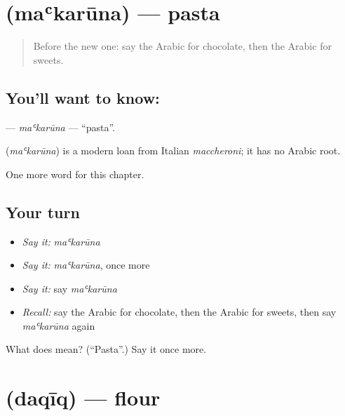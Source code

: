 \section[\texorpdfstring{\ar{معكرونة} (maʿkarūna)}{معكرونة (maʿkarūna)}]{ (maʿkarūna) — pasta}

\label{lesson:AR-C273-makaruna}



\begin{quote}
Before the new one: say the Arabic for chocolate, then the Arabic for sweets.
\end{quote}

\subsection*{You'll want to know: }
\textbf{} — \emph{maʿkarūna} — \textquotedblleft{}pasta\textquotedblright{}.

\begin{cousinweb}
\textbf{} (\emph{maʿkarūna}) is a modern loan from Italian \emph{maccheroni}; it has no Arabic root.
\end{cousinweb}

\begin{grammarlens}[title={What you've built}]
One more word for this chapter.
\end{grammarlens}

\subsection*{Your turn}
\begin{itemize}
\raggedright
  \item \emph{Say it:} \emph{maʿkarūna}
  \item \emph{Say it:} \emph{maʿkarūna}, once more
  \item \emph{Say it:} say \emph{maʿkarūna}
  \item \emph{Recall:} say the Arabic for chocolate, then the Arabic for sweets, then say \emph{maʿkarūna} again
\end{itemize}

\begin{tcolorbox}[breakable,colback=teal!4,colframe=teal!35!black,title={Before you move on}]
What does  mean? (\textquotedblleft{}Pasta\textquotedblright{}.) Say it once more.
\end{tcolorbox}
\section[\texorpdfstring{\ar{دقيق} (daqīq)}{دقيق (daqīq)}]{ (daqīq) — flour}

